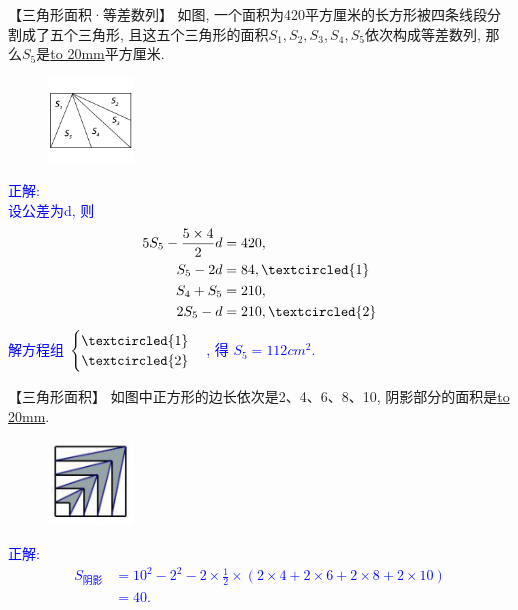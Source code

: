 \item {
    【三角形面积·等差数列】
    如图, 一个面积为420平方厘米的长方形被四条线段分割成了五个三角形, 且这五个三角形的面积$S_1, S_2, S_3, S_4, S_5$依次构成等差数列, 那么$S_5$是\underline{\hbox to 20mm{}}平方厘米.
    \begin{figure}[H] 
        \centering
        \includegraphics[width=0.2\textwidth]{./pics/Chapter_2/16.png}
    \end{figure}
    \ifshowSolution 
        \fangsong{}\textcolor{blue}{
            正解: \\
            设公差为d, 则 
            \begin{align*}
                5S_{5} - \frac{5\times 4}{2}d &= 420, \\
                S_{5} - 2d &= 84, \textcircled{1} \\
                S_{4} + S_{5} &= 210, \\
                2S_{5} - d &= 210, \textcircled{2} \\
            \end{align*}
            解方程组
                $\begin{cases}
                    \textcircled{1} \\ 
                    \textcircled{2}  
                \end{cases}$,
            得 $S_{5}=112 {cm}^2.$
        }
    \else
        \vspace{1cm}
    \fi
}

\item {
    【三角形面积】
    如图中正方形的边长依次是2、4、6、8、10, 阴影部分的面积是\underline{\hbox to 20mm{}}.
    \begin{figure}[H] 
        \centering
        \includegraphics[width=0.2\textwidth]{./pics/Chapter_2/17.png}
    \end{figure}
    \ifshowSolution 
        \fangsong{}\textcolor{blue}{
            正解: \\
            \begin{align*}
                S_{阴影} &= 10^2 - 2^2 - 2\times \frac12\times (2\times 4 + 2\times 6 + 2\times 8 + 2\times 10) \\
                &= 40.
            \end{align*}
        }
    \else
        \vspace{1cm}
    \fi
}

